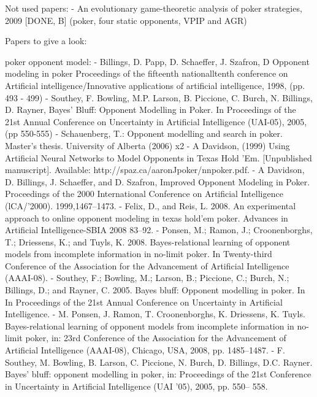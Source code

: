 Not used papers:
- An evolutionary game-theoretic analysis of poker strategies, 2009 [DONE, B] (poker, four static opponents, VPIP and AGR)


Papers to give a look:

poker opponent model:
- Billings, D. Papp, D. Schaeffer, J. Szafron, D Opponent modeling in
poker Proceedings of the fifteenth nationalltenth conference on
Artificial intelligence/Innovative applications of artificial
intelligence, 1998, (pp. 493 - 499)
- Southey, F. Bowling, M.P. Larson, B. Piccione, C. Burch, N. Billings,
D. Rayner, Bayes' Bluff: Opponent Modelling in Poker. In
Proceedings of the 21st Annual Conference on Uncertainty in
Artificial Intelligence (UAI-05), 2005, (pp 550-555)
- Schauenberg, T.: Opponent modelling and search in poker. Master’s thesis. University of
Alberta (2006) x2
- A Davidson, (1999) Using Artificial Neural Networks to Model
Opponents in Texas Hold 'Em. [Unpublished manuscript]. Available:
http://spaz.ca/aaronJpoker/nnpoker.pdf.
- A Davidson, D. Billings, J. Schaeffer, and D. Szafron, Improved
Opponent Modeling in Poker. Proceedings of the 2000 International
Conference on Artificial Intelligence (lCA/'2000). 1999,1467--1473.
- Felix, D., and Reis, L. 2008. An experimental approach to
online opponent modeling in texas hold’em poker. Advances
in Artificial Intelligence-SBIA 2008 83–92.
- Ponsen, M.; Ramon, J.; Croonenborghs, T.; Driessens, K.;
and Tuyls, K. 2008. Bayes-relational learning of opponent
models from incomplete information in no-limit poker. In
Twenty-third Conference of the Association for the Advancement
of Artificial Intelligence (AAAI-08).
- Southey, F.; Bowling, M.; Larson, B.; Piccione, C.; Burch,
N.; Billings, D.; and Rayner, C. 2005. Bayes bluff: Opponent
modelling in poker. In In Proceedings of the 21st
Annual Conference on Uncertainty in Artificial Intelligence.
- M. Ponsen, J. Ramon, T. Croonenborghs, K. Driessens, K. Tuyls. Bayes-relational
learning of opponent models from incomplete information in no-limit poker,
in: 23rd Conference of the Association for the Advancement of Artificial
Intelligence (AAAI-08), Chicago, USA, 2008, pp. 1485–1487.
- F. Southey, M. Bowling, B. Larson, C. Piccione, N. Burch, D. Billings, D.C. Rayner.
Bayes’ bluff: opponent modelling in poker, in: Proceedings of the 21st
Conference in Uncertainty in Artificial Intelligence (UAI ’05), 2005, pp. 550–
558.

